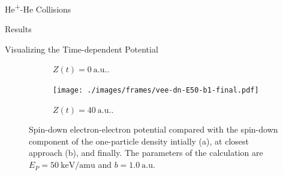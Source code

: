 \documentclass[letterpaper, 11 pt]{report}
\begin{document}
\begin{chapter}{\texorpdfstring{He\textsuperscript{+}}{He+}-He Collisions \label{chap:hephe}}
\begin{section}{Results \label{sec:hephe-disc}}
\begin{subsection}{Visualizing the Time-dependent Potential \label{sec:visual}}
\begin{figure}[b]
\begin{subfigure}{.49\textwidth}
               \caption{$Z(t) = 0~\mathrm{a.u.}$. \label{fig:dnC}}
            \end{subfigure}
            \begin{subfigure}{.49\textwidth}
               \centering
               \texttt{[image: ./images/frames/vee-dn-E50-b1-final.pdf]}
               \caption{$Z(t) = 40~\mathrm{a.u.}$. \label{fig:dnF}}
            \end{subfigure}
            \caption[Spin-down electron-electron potential]
                    {Spin-down electron-electron potential compared with the spin-down component of the
                    one-particle density intially (a), at closest approach (b), and finally.
                    The parameters of the calculation are $E_P = 50~\mathrm{keV/amu}$ and
                    $b = 1.0~\mathrm{a.u.}$ \label{fig:dnPlots}}
         \end{figure}


\end{subsection}
\end{section}
\end{chapter}
\end{document}
